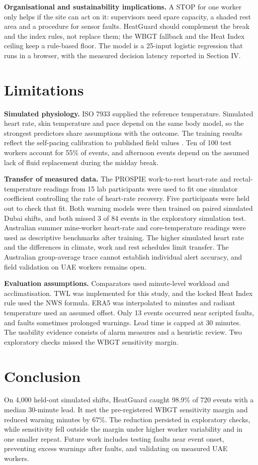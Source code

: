 \documentclass[conference,a4paper]{IEEEtran}
\begin{document}
\textbf{Organisational and sustainability implications.} A STOP for one worker only helps if the site can act on it: supervisors need spare capacity, a shaded rest area and a procedure for sensor faults. HeatGuard should complement the break and the index rules, not replace them; the WBGT fallback and the Heat Index ceiling keep a rule-based floor. The model is a 25-input logistic regression that runs in a browser, with the measured decision latency reported in Section IV.

\section{Limitations}
\textbf{Simulated physiology.} ISO 7933 supplied the reference temperature. Simulated heart rate, skin temperature and pace depend on the same body model, so the strongest predictors share assumptions with the outcome. The training results reflect the self-pacing calibration to published field values \cite{krisher}. Ten of 100 test workers account for 55\% of events, and afternoon events depend on the assumed lack of fluid replacement during the midday break.

\textbf{Transfer of measured data.} The PROSPIE work-to-rest heart-rate and rectal-temperature readings from 15 lab participants were used to fit one simulator coefficient controlling the rate of heart-rate recovery. Five participants were held out to check that fit. Both warning models were then trained on paired simulated Dubai shifts, and both missed 3 of 84 events in the exploratory simulation test. Australian summer mine-worker heart-rate and core-temperature readings were used as descriptive benchmarks after training. The higher simulated heart rate and the differences in climate, work and rest schedules limit transfer. The Australian group-average trace cannot establish individual alert accuracy, and field validation on UAE workers remains open.

\textbf{Evaluation assumptions.} Comparators used minute-level workload and acclimatisation. TWL was implemented for this study, and the locked Heat Index rule used the NWS formula. ERA5 was interpolated to minutes and radiant temperature used an assumed offset. Only 13 events occurred near scripted faults, and faults sometimes prolonged warnings. Lead time is capped at 30 minutes. The usability evidence consists of alarm measures and a heuristic review. Two exploratory checks missed the WBGT sensitivity margin.

\section{Conclusion}
On 4,000 held-out simulated shifts, HeatGuard caught 98.9\% of 720 events with a median 30-minute lead. It met the pre-registered WBGT sensitivity margin and reduced warning minutes by 67\%. The reduction persisted in exploratory checks, while sensitivity fell outside the margin under higher worker variability and in one smaller repeat. Future work includes testing faults near event onset, preventing excess warnings after faults, and validating on measured UAE workers.
\end{document}
